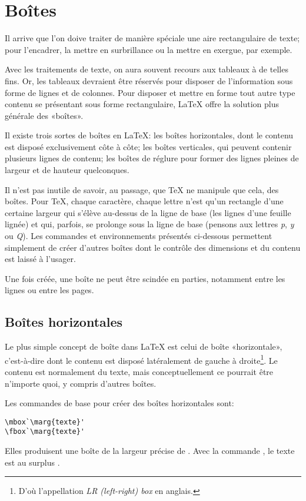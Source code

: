 \chapter{Boîtes}
\label{chap:boites}

Il arrive que l'on doive traiter de manière spéciale une aire
rectangulaire de texte; pour l'encadrer, la mettre en surbrillance ou
la mettre en exergue, par exemple.

Avec les traitements de texte, on aura souvent recours aux tableaux à
de telles fins. Or, les tableaux devraient être réservés pour disposer
de l'information sous forme de lignes et de colonnes. Pour disposer et
mettre en forme tout autre type contenu se présentant sous forme
rectangulaire, {\LaTeX} offre la solution plus générale des «boîtes».

Il existe trois sortes de boîtes en {\LaTeX}: les boîtes horizontales,
dont le contenu est disposé exclusivement côte à côte; les boîtes
verticales, qui peuvent contenir plusieurs lignes de contenu; les
boîtes de réglure pour former des lignes pleines de largeur et de
hauteur quelconques.

Il n'est pas inutile de savoir, au passage, que {\TeX} ne manipule que
cela, des boîtes. Pour {\TeX}, chaque caractère, chaque lettre n'est
qu'un rectangle d'une certaine largeur qui s'élève au-dessus de la
ligne de base (les lignes d'une feuille lignée) et qui, parfois, se
prolonge sous la ligne de base (pensons aux lettres \emph{p}, \emph{y}
ou \emph{Q}). Les commandes et environnements présentés ci-dessous
permettent simplement de créer d'autres boîtes dont le contrôle des
dimensions et du contenu est laissé à l'usager.

Une fois créée, une boîte ne peut être scindée en parties, notamment
entre les lignes ou entre les pages.



\section{Boîtes horizontales}
\label{sec:boites:lrbox}

Le plus simple concept de boîte dans {\LaTeX} est celui de boîte
«horizontale», c'est-à-dire dont le contenu est disposé latéralement
de gauche à droite\footnote{%
  D'où l'appellation \emph{LR (left-right) box} en anglais.}. %
Le contenu est normalement du texte, mais conceptuellement ce pourrait
être n'importe quoi, y compris d'autres boîtes.

Les commandes de base pour créer des boîtes horizontales sont:
\begin{lstlisting}
\mbox`\marg{texte}'
\fbox`\marg{texte}'
\end{lstlisting}
Elles produisent une boîte de la largeur précise de . Avec
la commande \cmd{\fbox}, le texte est au surplus .

